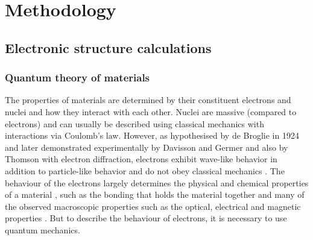 \documentclass[11pt, twoside]{report}
\begin{document}

 



\chapter{Methodology}

\section{Electronic structure calculations}\label{elec_struc}

\subsection{Quantum theory of materials}


The properties of materials are determined by their constituent electrons and nuclei and how they interact with each other. Nuclei are massive (compared to electrons) and can usually be described using classical mechanics with interactions via Coulomb's law. However, as hypothesised by de Broglie in 1924 and later demonstrated experimentally by Davisson and Germer and also by Thomson with electron diffraction, electrons exhibit wave-like behavior in addition to particle-like behavior and do not obey classical mechanics \cite{quantum_intro}. The behaviour of the electrons largely determines the physical and chemical properties of a material \cite{Prasad_ch2}, such as the bonding that holds the material together and many of the observed macroscopic properties such as the optical, electrical and magnetic properties \cite{RichardMartin_Ch1}. But to describe the behaviour of electrons, it is necessary to use quantum mechanics.
\end{document}
